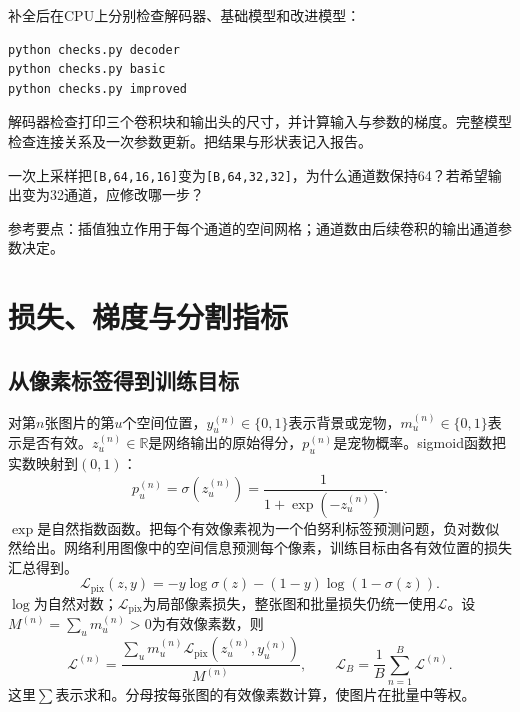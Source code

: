 \documentclass[UTF8,a4paper,11pt,fontset=fandol]{ctexart}
\newcommand{\shape}[1]{\texttt{#1}}
\begin{document}
补全后在CPU上分别检查解码器、基础模型和改进模型：
\begin{lstlisting}[language=bash]
python checks.py decoder
python checks.py basic
python checks.py improved
\end{lstlisting}
解码器检查打印三个卷积块和输出头的尺寸，并计算输入与参数的梯度。完整模型检查连接关系及一次参数更新。把结果与形状表记入报告。
\begin{questionbox}[检查点]
一次上采样把\shape{[B,64,16,16]}变为\shape{[B,64,32,32]}，为什么通道数保持64？若希望输出变为32通道，应修改哪一步？
\end{questionbox}
参考要点：插值独立作用于每个通道的空间网格；通道数由后续卷积的输出通道参数决定。
\clearpage

\section{损失、梯度与分割指标}
\subsection{从像素标签得到训练目标}
对第$n$张图片的第$u$个空间位置，$y_u^{(n)}\in\{0,1\}$表示背景或宠物，$m_u^{(n)}\in\{0,1\}$表示是否有效。$z_u^{(n)}\in\mathbb R$是网络输出的原始得分，$p_u^{(n)}$是宠物概率。sigmoid函数把实数映射到$(0,1)$：
\begin{equation}
p_u^{(n)}=\sigma(z_u^{(n)})=\frac{1}{1+\exp(-z_u^{(n)})}.
\end{equation}
$\exp$是自然指数函数。把每个有效像素视为一个伯努利标签预测问题，负对数似然给出。网络利用图像中的空间信息预测每个像素，训练目标由各有效位置的损失汇总得到。
\begin{equation}
\mathcal L_{\mathrm{pix}}(z,y)=-y\log\sigma(z)-(1-y)\log(1-\sigma(z)).
\end{equation}
$\log$为自然对数；$\mathcal L_{\mathrm{pix}}$为局部像素损失，整张图和批量损失仍统一使用$\mathcal L$。设$M^{(n)}=\sum_u m_u^{(n)}>0$为有效像素数，则
\begin{equation}
\mathcal L^{(n)}=\frac{\sum_u m_u^{(n)}\mathcal L_{\mathrm{pix}}(z_u^{(n)},y_u^{(n)})}{M^{(n)}},\qquad
\mathcal L_B=\frac1B\sum_{n=1}^{B}\mathcal L^{(n)}.
\end{equation}
这里$\sum$表示求和。分母按每张图的有效像素数计算，使图片在批量中等权。
\end{document}
